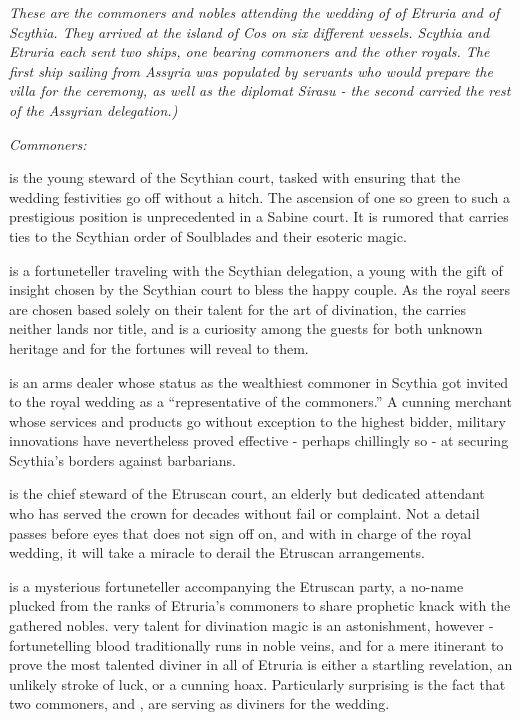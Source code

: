 \documentclass[blue]{Kos}
\begin{document}
\name{\bWhosWho{}}

\emph{These are the commoners and nobles attending the wedding of \cGroom{\Prince} \cGroom{} of Etruria and \cBride{\Prince} \cBride{} of Scythia. They arrived at the island of Cos on six different vessels. Scythia and Etruria each sent two ships, one bearing commoners and the other royals. The first ship sailing from Assyria was populated by servants who would prepare the villa for the ceremony, as well as the diplomat Sirasu - the second carried the rest of the Assyrian delegation.)}

\emph{Commoners:}

\cButler{} is the young steward of the Scythian court, tasked with ensuring that the wedding festivities go off without a hitch. The ascension of one so green to such a prestigious position is unprecedented in a Sabine court. It is rumored that \cButler{\they} carries ties to the Scythian order of Soulblades and their esoteric magic.

\cBurglar{} is a fortuneteller traveling with the Scythian delegation, a young \cBurglar{\human} with the gift of insight chosen by the Scythian court to bless the happy couple. As the royal seers are chosen based solely on their talent for the art of divination, the \cBurglar{\human} carries neither lands nor title, and \cBurglar{\they} is a curiosity among the guests for both \cBurglar{\their} unknown heritage and for the fortunes \cBurglar{\they} will reveal to them.

\cArmsDealer{} is an arms dealer whose status as the wealthiest commoner in Scythia got \cArmsDealer{\them} invited to the royal wedding as a ``representative of the commoners.'' A cunning merchant whose services and products go without exception to the highest bidder, \cArmsDealer{\their} military innovations have nevertheless proved effective - perhaps chillingly so - at securing Scythia's borders against barbarians.

\cAssassin{} is the chief steward of the Etruscan court, an elderly but dedicated attendant who has served the crown for decades without fail or complaint. Not a detail passes before \cAssassin{\their} eyes that \cAssassin{\they} does not sign off on, and with \cAssassin{\them} in charge of the royal wedding, it will take a miracle to derail the Etruscan arrangements.

\cFugitive{} is a mysterious fortuneteller accompanying the Etruscan party, a no-name plucked from the ranks of Etruria's commoners to share \cFugitive{\their} prophetic knack with the gathered nobles. \cFugitive{\Their} very talent for divination magic is an astonishment, however - fortunetelling blood traditionally runs in noble veins, and for a mere itinerant to prove the most talented diviner in all of Etruria is either a startling revelation, an unlikely stroke of luck, or a cunning hoax. Particularly surprising is the fact that two commoners, \cFugitive{} and \cBurglar{}, are serving as diviners for the wedding.
\end{document}
